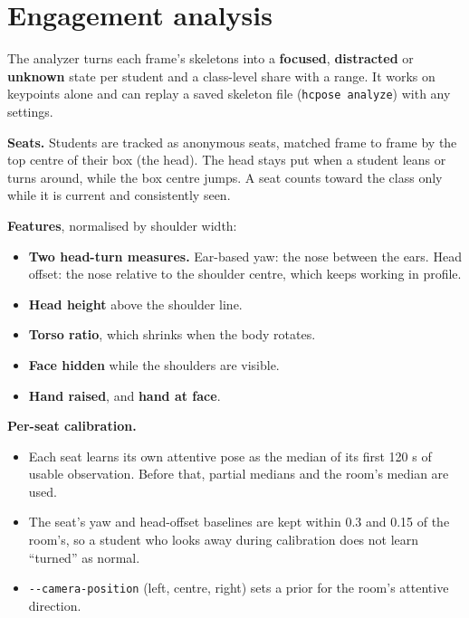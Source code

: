
\section{Engagement analysis}

The analyzer turns each frame's skeletons into a \textbf{focused}, \textbf{distracted} or \textbf{unknown} state per student and a class-level share with a range. It works on keypoints alone and can replay a saved skeleton file (\texttt{hcpose\ analyze}) with any settings.

\textbf{Seats.} Students are tracked as anonymous seats, matched frame to frame by the top centre of their box (the head). The head stays put when a student leans or turns around, while the box centre jumps. A seat counts toward the class only while it is current and consistently seen.

\textbf{Features}, normalised by shoulder width:

\begin{itemize}
\tightlist
\item
  \textbf{Two head-turn measures.} Ear-based yaw: the nose between the ears. Head offset: the nose relative to the shoulder centre, which keeps working in profile.
\item
  \textbf{Head height} above the shoulder line.
\item
  \textbf{Torso ratio}, which shrinks when the body rotates.
\item
  \textbf{Face hidden} while the shoulders are visible.
\item
  \textbf{Hand raised}, and \textbf{hand at face}.
\end{itemize}

\textbf{Per-seat calibration.}

\begin{itemize}
\tightlist
\item
  Each seat learns its own attentive pose as the median of its first 120 s of usable observation. Before that, partial medians and the room's median are used.
\item
  The seat's yaw and head-offset baselines are kept within 0.3 and 0.15 of the room's, so a student who looks away during calibration does not learn ``turned'' as normal.
\item
  \texttt{-\/-camera-position} (left, centre, right) sets a prior for the room's attentive direction.
\end{itemize}

